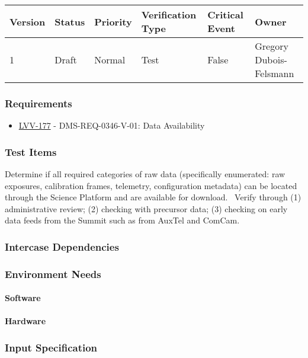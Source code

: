 \begin{longtable}[]{llllll}
\toprule
Version & Status & Priority & Verification Type & Critical Event & Owner
\\\midrule
1 & Draft & Normal &
Test & False & Gregory Dubois-Felsmann
\\\bottomrule
\end{longtable}

\subsubsection{Requirements}
\begin{itemize}
\item \href{https://jira.lsstcorp.org/browse/LVV-177}{LVV-177} - DMS-REQ-0346-V-01: Data Availability
\end{itemize}

\subsubsection{Test Items}
Determine if all required categories of raw data (specifically
enumerated: raw exposures, calibration frames, telemetry, configuration
metadata) can be located through the Science Platform and are available
for download. ~Verify through (1) administrative review; (2) checking
with precursor data; (3) checking on early data feeds from the Summit
such as from AuxTel and ComCam.



\subsubsection{Intercase Dependencies}

\subsubsection{Environment Needs}

\paragraph{Software}

\paragraph{Hardware}

\subsubsection{Input Specification}

